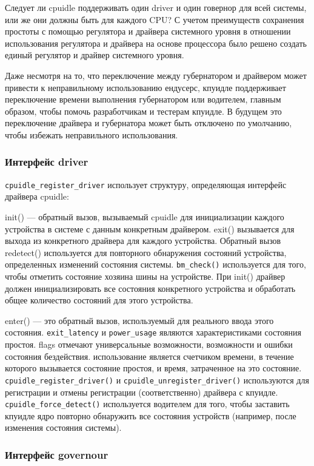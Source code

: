 \documentclass{article}
\begin{document}
Следует ли cpuidle поддерживать один driver и один говернор для всей системы, или же они должны быть для каждого CPU?
С учетом преимуществ сохранения простоты с помощью регулятора и драйвера системного уровня в отношении использования регулятора и драйвера на основе процессора было решено создать единый регулятор и драйвер системного уровня.

Даже несмотря на то, что переключение между губернатором и драйвером может привести к неправильному использованию ендусерс, кпуидле поддерживает переключение времени выполнения губернатором или водителем, главным образом, чтобы помочь разработчикам и тестерам кпуидле. В будущем это переключение драйвера и губернатора может быть отключено по умолчанию, чтобы избежать неправильного использования.

\subsubsection{Интерфейс driver}
\texttt{cpuidle\_register\_driver} использует структуру, определяющая интерфейс драйвера cpuidle:

init() — обратный вызов, вызываемый cpuidle для инициализации каждого устройства в системе с данным конкретным драйвером.
exit() вызывается для выхода из конкретного драйвера для каждого устройства. Обратный вызов redetect() используется для повторного обнаружения состояний устройства, определенных изменений состояния системы.
\texttt{bm\_check()} используется для того, чтобы отметить состояние хозяина шины на устройстве. При init() драйвер должен инициализировать все состояния конкретного устройства и обработать общее количество состояний для этого устройства.



enter() — это обратный вызов, используемый для реального ввода этого состояния. \texttt{exit\_latency} и \texttt{power\_usage} являются характеристиками состояния простоя. flags отмечают универсальные возможности, возможности и ошибки состояния бездействия. использование является счетчиком времени, в течение которого вызывается состояние простоя, и время, затраченное на это состояние.
\texttt{cpuidle\_register\_driver()} и \texttt{cpuidle\_unregister\_driver()} используются для регистрации и отмены регистрации (соответственно) драйвера с кпуидле.
\texttt{cpuidle\_force\_detect()} используется водителем для того, чтобы заставить кпуидле ядро повторно обнаружить все состояния устройств (например, после изменения состояния системы).

\subsubsection{Интерфейс governour}

\end{document}
